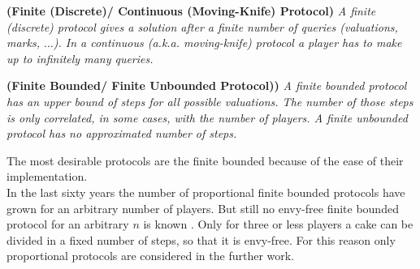 \begin{defi}{\textbf{(Finite (Discrete)/ Continuous (Moving-Knife) Protocol)}}
\newline \emph{A \emph{finite (discrete) protocol} gives a solution after a finite number of queries (valuations, marks, $\ldots$). In a \emph{continuous (a.k.a. moving-knife) protocol} a player has to make up to infinitely many queries.}
\end{defi}
\begin{defi}{\textbf{(Finite Bounded/ Finite Unbounded Protocol))}}
\newline \emph{A \emph{finite bounded protocol} has an upper bound of steps for all possible valuations. The number of those steps is only correlated, in some cases, with the number of players. A \emph{finite unbounded protocol} has no approximated number of steps.}
\end{defi}
The most desirable protocols are the finite bounded because of the ease of their implementation. \\
In the last sixty years the number of proportional finite bounded protocols have grown for an arbitrary number of players. But still no envy-free finite bounded protocol for an arbitrary $n$ is known \cite{chen:truth}. Only for three or less players a cake can be divided in a fixed number of steps, so that it is envy-free. For this reason only proportional protocols are considered in the further work.
